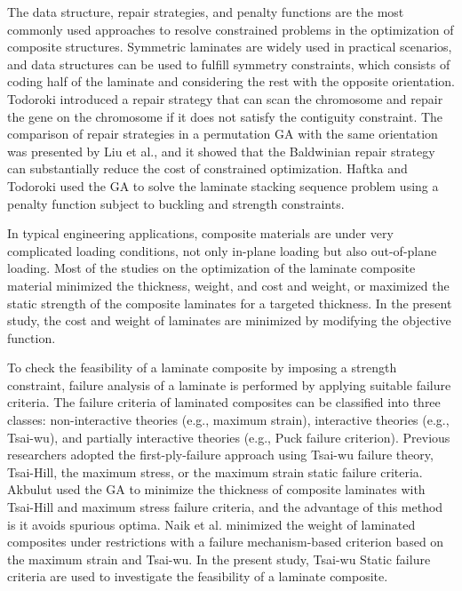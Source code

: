 The data structure, repair strategies, and penalty functions\cite{le1995improved} are the most commonly used
approaches to resolve constrained problems in the optimization of composite structures. Symmetric
laminates are widely used in practical scenarios, and data structures can be used to fulfill symmetry
constraints, which consists of coding half of the laminate and considering the rest with the
opposite orientation. Todoroki\cite{todoroki1998stacking} introduced a repair strategy that can scan the chromosome and
repair the gene on the chromosome if it does not satisfy the contiguity constraint. The comparison of
repair strategies in a permutation GA with the same orientation was presented by Liu et al.\cite{liu2000permutation}, and it
showed that the Baldwinian repair strategy can substantially reduce the cost of constrained optimization.
Haftka and Todoroki\cite{riche1993optimization} used the GA to solve the laminate stacking sequence problem using a penalty function subject to
buckling and strength constraints.

In typical engineering applications, composite materials are under very complicated loading
conditions, not only in-plane loading but also out-of-plane loading. Most of the studies on the
optimization of the laminate composite material minimized the
thickness\cite{abu1998optimum,walker2003technique},
weight\cite{fang1993design,deka2005multiobjective,park2008improved}, and cost and
weight\cite{deka2005multiobjective,omkar2008artificial}, or maximized the static strength of
the composite laminates for a targeted
thickness\cite{walker2003technique,lin2004stacking,kim2007development,gholami2020multi}. 
In the present study,
the cost and weight of laminates are minimized by modifying the objective function.

To check the feasibility of a laminate composite by imposing a strength constraint, failure
analysis of a laminate is performed by applying suitable failure criteria. The failure criteria of
laminated composites can be classified into three classes: non-interactive theories (e.g., maximum
strain), interactive theories (e.g., Tsai-wu), and partially interactive theories (e.g., Puck failure
criterion). Previous researchers adopted the first-ply-failure approach using Tsai-wu
failure
theory\cite{massard1984computer,reddy1987first,fang1993design,soeiro1994multilevel,pelletier2006multi,jadhav2007parametric,omkar2008artificial,choudhury2019failure},
Tsai-Hill\cite{martin1987optimum,soares1995discrete}, the maximum stress\cite{watkins1987multicriteria}, or the maximum strain\cite{watkins1987multicriteria}
static failure criteria. Akbulut\cite{akbulut2008optimum} used the GA to minimize the thickness of composite laminates with
Tsai-Hill and maximum stress failure criteria, and the advantage of this method is it avoids spurious
optima. Naik et al.\cite{naik2008design}
minimized the weight of laminated composites under restrictions with a
failure mechanism-based criterion based on the maximum strain and Tsai-wu. In the present study, Tsai-wu
Static failure criteria are used to investigate the feasibility of a laminate composite.



